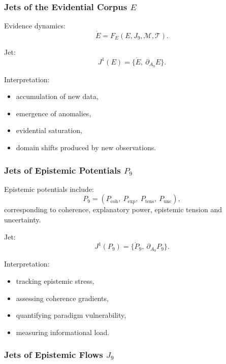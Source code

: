 \subsubsection{Jets of the Evidential Corpus \texorpdfstring{$E$}{E}}

Evidence dynamics:
\[
\dot{E}=F_E(E,J_9,\mathcal{M},\mathcal{T}).
\]

Jet:
\[
J^1(E)=\{\dot{E},\ \partial_{A_9}E\}.
\]

Interpretation:
\begin{itemize}
    \item accumulation of new data,
    \item emergence of anomalies,
    \item evidential saturation,
    \item domain shifts produced by new observations.
\end{itemize}


\subsubsection{Jets of Epistemic Potentials \texorpdfstring{$P_9$}{P_9}}

Epistemic potentials include:
\[
P_9=
(P_{\mathrm{coh}},\ 
 P_{\mathrm{exp}},\ 
 P_{\mathrm{tens}},\ 
 P_{\mathrm{unc}}),
\]
corresponding to coherence, explanatory power, epistemic tension and
uncertainty.

Jet:
\[
J^1(P_9)=\{\dot{P}_9,\ \partial_{A_9}P_9\}.
\]

Interpretation:
\begin{itemize}
    \item tracking epistemic stress,
    \item assessing coherence gradients,
    \item quantifying paradigm vulnerability,
    \item measuring informational load.
\end{itemize}


\subsubsection{Jets of Epistemic Flows \texorpdfstring{$J_9$}{J_9}}

